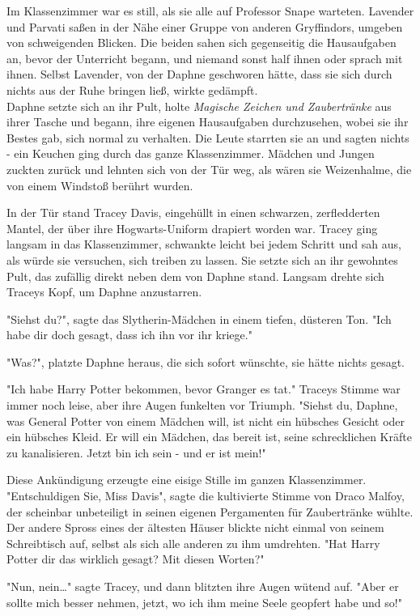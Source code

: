 {Im Klassenzimmer war es still, als sie alle auf Professor Snape warteten. Lavender und Parvati saßen in der Nähe einer Gruppe von anderen Gryffindors, umgeben von schweigenden Blicken. Die beiden sahen sich gegenseitig die Hausaufgaben an, bevor der Unterricht begann, und niemand sonst half ihnen oder sprach mit ihnen. Selbst Lavender, von der Daphne geschworen hätte, dass sie sich durch nichts aus der Ruhe bringen ließ, wirkte gedämpft.\\ Daphne setzte sich an ihr Pult, holte \emph{Magische Zeichen und Zaubertränke} aus ihrer Tasche und begann, ihre eigenen Hausaufgaben durchzusehen, wobei sie ihr Bestes gab, sich normal zu verhalten. Die Leute starrten sie an und sagten nichts - ein Keuchen ging durch das ganze Klassenzimmer. Mädchen und Jungen zuckten zurück und lehnten sich von der Tür weg, als wären sie Weizenhalme, die von einem Windstoß berührt wurden.

In der Tür stand Tracey Davis, eingehüllt in einen schwarzen, zerfledderten Mantel, der über ihre Hogwarts-Uniform drapiert worden war. Tracey ging langsam in das Klassenzimmer, schwankte leicht bei jedem Schritt und sah aus, als würde sie versuchen, sich treiben zu lassen. Sie setzte sich an ihr gewohntes Pult, das zufällig direkt neben dem von Daphne stand. Langsam drehte sich Traceys Kopf, um Daphne anzustarren.

"Siehst du?", sagte das Slytherin-Mädchen in einem tiefen, düsteren Ton. "Ich habe dir doch gesagt, dass ich ihn vor ihr kriege."

"Was?", platzte Daphne heraus, die sich sofort wünschte, sie hätte nichts gesagt.

"Ich habe Harry Potter bekommen, bevor Granger es tat." Traceys Stimme war immer noch leise, aber ihre Augen funkelten vor Triumph. "Siehst du, Daphne, was General Potter von einem Mädchen will, ist nicht ein hübsches Gesicht oder ein hübsches Kleid. Er will ein Mädchen, das bereit ist, seine schrecklichen Kräfte zu kanalisieren. Jetzt bin ich sein - und er ist mein!"

Diese Ankündigung erzeugte eine eisige Stille im ganzen Klassenzimmer. "Entschuldigen Sie, Miss Davis", sagte die kultivierte Stimme von Draco Malfoy, der scheinbar unbeteiligt in seinen eigenen Pergamenten für Zaubertränke wühlte. Der andere Spross eines der ältesten Häuser blickte nicht einmal von seinem Schreibtisch auf, selbst als sich alle anderen zu ihm umdrehten. "Hat Harry Potter dir das wirklich gesagt? Mit diesen Worten?"

"Nun, nein…" sagte Tracey, und dann blitzten ihre Augen wütend auf. "Aber er sollte mich besser nehmen, jetzt, wo ich ihm meine Seele geopfert habe und so!"

}
